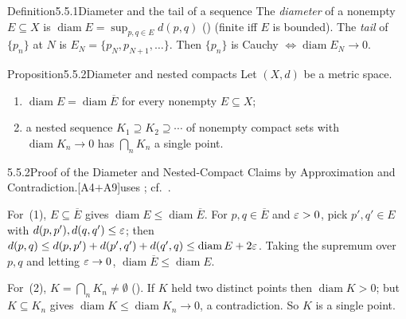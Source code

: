 \documentclass[main.tex]{subfiles}
\begin{document}
\begin{Obj}{Definition}{5.5.1}{Diameter and the tail of a sequence}
The \emph{diameter} of a nonempty $E\subseteq X$ is $\operatorname{diam}E=\sup_{p,q\in E}d(p,q)$
() (finite iff $E$ is bounded). The \emph{tail} of $\{p_n\}$ at $N$ is $E_N=\{p_N,p_{N+1},\dots\}$. Then
$\{p_n\}$ is Cauchy $\iff\operatorname{diam}E_N\to0$.
\end{Obj}

\begin{Obj}{Proposition}{5.5.2}{Diameter and nested compacts}
Let $(X,d)$ be a metric space.
\begin{enumerate}
  \item $\operatorname{diam}E=\operatorname{diam}\overline E$ for every nonempty $E\subseteq X$;
  \item a nested sequence $K_1\supseteq K_2\supseteq\cdots$ of nonempty compact sets with
    $\operatorname{diam}K_n\to0$ has $\bigcap_n K_n$ a single point.
\end{enumerate}
\end{Obj}
\begin{Prf}{5.5.2}{Proof of the Diameter and Nested-Compact Claims by Approximation and Contradiction.}{[A4$+$A9]\quad uses ; cf.\ .}
\item For~(1), $E\subseteq\overline E$ gives $\operatorname{diam}E\le\operatorname{diam}\overline E$.
  For $p,q\in\overline E$ and $\varepsilon>0$, pick $p',q'\in E$ with $d(p,p'),d(q,q')\le\varepsilon$; then
  $d(p,q)\le d(p,p')+d(p',q')+d(q',q)\le\operatorname{diam}E+2\varepsilon$. Taking the supremum over $p,q$
  and letting $\varepsilon\to0$, $\operatorname{diam}\overline E\le\operatorname{diam}E$.
\item For~(2), $K=\bigcap_n K_n\neq\emptyset$ (). If $K$ held two distinct points then
  $\operatorname{diam}K>0$; but $K\subseteq K_n$ gives $\operatorname{diam}K\le\operatorname{diam}K_n
  \to0$, a contradiction. So $K$ is a single point.
\end{Prf}
\end{document}
